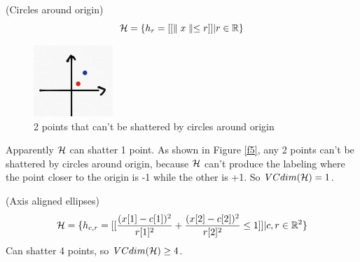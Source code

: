 \documentclass{article}
\begin{document}
\begin{example}(Circles around origin)
	\begin{displaymath}
		\mathcal{H} = \{h_r=[[\parallel x \parallel\leq r]]|r\in \mathbb{R} \}
	\end{displaymath}
  \begin{figure}[H]
  \centering
  \includegraphics[width=30mm]{f6}
  \caption{2 points that can't be shattered by circles around origin}\label{f6}
  \end{figure}
	Apparently $\mathcal{H}$ can shatter 1 point. As shown in Figure \ref{f5}, any 2 points can't be shattered by circles around origin, because $\mathcal{H}$ can't produce the labeling where the point closer to the origin is -1 while the other is +1. So $VCdim(\mathcal{H}) = 1$.
\end{example}

\begin{example}(Axis aligned ellipses)
	\begin{displaymath}
		\mathcal{H} = \{h_{c,r}=[[\frac{(x[1]-c[1])^2}{r[1]^2}+\frac{(x[2]-c[2])^2}{r[2]^2}\leq 1]]| c, r\in\mathbb{R}^2\}
	\end{displaymath}
  Can shatter 4 points, so $VCdim(\mathcal{H})\geq 4$.
\end{example}
\end{document}
